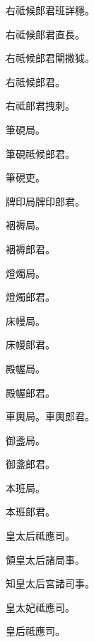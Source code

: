 \begin{pinyinscope}
 右祗候郎君班詳穩。



 右祗候郎君直長。



 右祗候郎君閘撒狘。



 右祗候郎君。



 右祗郎君拽刺。



 筆硯局。



 筆硯祗候郎君。



 筆硯吏。



 牌印局牌印郎君。



 裀褥局。



 裀褥郎君。



 燈燭局。



 燈燭郎君。



 床幔局。



 床幔郎君。



 殿幄局。



 殿幄郎君。



 車輿局。車輿郎君。



 御盞局。



 御盞郎君。



 本班局。



 本班郎君。



 皇太后祗應司。



 領皇太后諸局事。



 知皇太后宮諸司事。



 皇太妃祗應司。



 皇后祗應司。




\end{pinyinscope}
